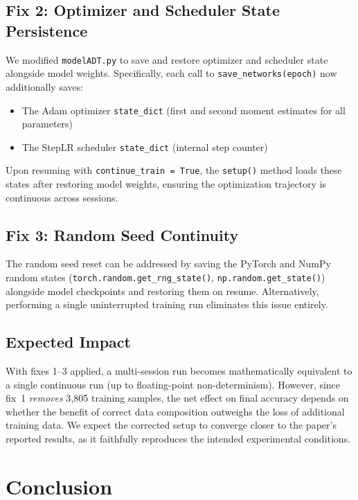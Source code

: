 \documentclass[12pt,a4paper]{article}
\begin{document}
\subsection{Fix 2: Optimizer and Scheduler State Persistence}

We modified \texttt{modelADT.py} to save and restore optimizer and scheduler state alongside model weights. Specifically, each call to \texttt{save\_networks(epoch)} now additionally saves:

\begin{itemize}[nosep]
    \item The Adam optimizer \texttt{state\_dict} (first and second moment estimates for all parameters)
    \item The StepLR scheduler \texttt{state\_dict} (internal step counter)
\end{itemize}

Upon resuming with \texttt{continue\_train = True}, the \texttt{setup()} method loads these states after restoring model weights, ensuring the optimization trajectory is continuous across sessions.

\subsection{Fix 3: Random Seed Continuity}

The random seed reset can be addressed by saving the PyTorch and NumPy random states (\texttt{torch.random.get\_rng\_state()}, \texttt{np.random.get\_state()}) alongside model checkpoints and restoring them on resume. Alternatively, performing a single uninterrupted training run eliminates this issue entirely.

\subsection{Expected Impact}

With fixes 1--3 applied, a multi-session run becomes mathematically equivalent to a single continuous run (up to floating-point non-determinism). However, since fix~1 \emph{removes} 3{,}805 training samples, the net effect on final accuracy depends on whether the benefit of correct data composition outweighs the loss of additional training data. We expect the corrected setup to converge closer to the paper's reported results, as it faithfully reproduces the intended experimental conditions.

\section{Conclusion}
\end{document}
